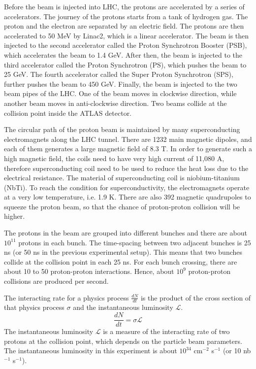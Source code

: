 Before the beam is injected into LHC, the protons are accelerated by a series of accelerators.
The journey of the protons starts from a tank of hydrogen gas.
The proton and the electron are separated by an electric field.
The protons are then accelerated to 50 MeV by Linac2, which is a linear accelerator.
The beam is then injected to the second accelerator called the Proton Synchrotron Booster (PSB), which accelerates the beam to 1.4 GeV.
After then, the beam is injected to the third accelerator called the Proton Synchrotron (PS), which pushes the beam to 25 GeV.
The fourth accelerator called the Super Proton Synchrotron (SPS), further pushes the beam to 450 GeV.
Finally, the beam is injected to the two beam pipes of the LHC.
One of the beam moves in clockwise direction, while another beam moves in anti-clockwise direction.
Two beams collide at the collision point inside the ATLAS detector.
\cite{accelerator}

The circular path of the proton beam is maintained by many superconducting electromagnets along the LHC tunnel.
There are 1232 main magnetic dipoles, and each of them generates a large magnetic field of 8.3 T.
In order to generate such a high magnetic field, the coils need to have very high current of 11,080 A, therefore superconducting coil need to be used to reduce the heat loss due to the electrical resistance.
The material of superconducting coil is niobium-titanium (NbTi).
To reach the condition for superconductivity, the electromagnets operate at a very low temperature, i.e. 1.9 K.
There are also 392 magnetic quadrupoles to squeeze the proton beam, so that the chance of proton-proton collision will be higher.
\cite{supermagnet,cryogenics}

The protons in the beam are grouped into different bunches and there are about $10^{11}$ protons in each bunch.
The time-spacing between two adjacent bunches is 25 ns (or 50 ns in the previous experimental setup).
This means that two bunches collide at the collision point in each 25 ns.
For each bunch crossing, there are about 10 to 50 proton-proton interactions.
Hence, about $10^9$ proton-proton collisions are produced per second.

The interacting rate for a physics process $\frac{dN}{dt}$ is the product of the cross section of that physics process $\sigma$ and the instantaneous luminosity $\mathcal{L}$.
\begin{equation}
\frac{dN}{dt} = \sigma \mathcal{L}
\end{equation}
The instantaneous luminosity $\mathcal{L}$ is a measure of the interacting rate of two protons at the collision point, which depends on the particle beam parameters.
The instantaneous luminosity in this experiment is about $10^{34}$ cm$^{-2}$ s$^{-1}$ (or 10 nb$^{-1}$ s$^{-1}$).

